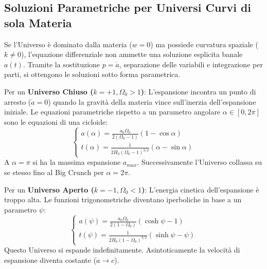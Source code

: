 \documentclass[11pt,a4paper]{report}
\begin{document}
\subsection{Soluzioni Parametriche per Universi Curvi di sola Materia}
Se l'Universo è dominato dalla materia ($w=0$) ma possiede curvatura spaziale ($k \neq 0$), l'equazione differenziale non ammette una soluzione esplicita banale $a(t)$. Tramite la sostituzione $p = \dot{a}$, separazione delle variabili e integrazione per parti, si ottengono le soluzioni sotto forma parametrica.

Per un \textbf{Universo Chiuso ($k=+1, \Omega_0 > 1$)}:
L'espansione incontra un punto di arresto ($\dot{a}=0$) quando la gravità della materia vince sull'inerzia dell'espansione iniziale. Le equazioni parametriche rispetto a un parametro angolare $\alpha \in [0, 2\pi]$ sono le equazioni di una cicloide:
\begin{equation}
\begin{cases}
a(\alpha) = \frac{a_0 \Omega_0}{2(\Omega_0 - 1)} (1 - \cos\alpha) \\
t(\alpha) = \frac{1}{2H_0 (\Omega_0 - 1)^{3/2}} (\alpha - \sin\alpha)
\end{cases}
\end{equation}
A $\alpha = \pi$ si ha la massima espansione $a_{max}$. Successivamente l'Universo collassa su se stesso fino al Big Crunch per $\alpha = 2\pi$.

Per un \textbf{Universo Aperto ($k=-1, \Omega_0 < 1$)}:
L'energia cinetica dell'espansione è troppo alta. Le funzioni trigonometriche diventano iperboliche in base a un parametro $\psi$:
\begin{equation}
\begin{cases}
a(\psi) = \frac{a_0 \Omega_0}{2(1 - \Omega_0)} (\cosh\psi - 1) \\
t(\psi) = \frac{1}{2H_0 (1 - \Omega_0)^{3/2}} (\sinh\psi - \psi)
\end{cases}
\end{equation}
Questo Universo si espande indefinitamente. Asintoticamente la velocità di espansione diventa costante ($\dot{a} \to c$).
\end{document}

